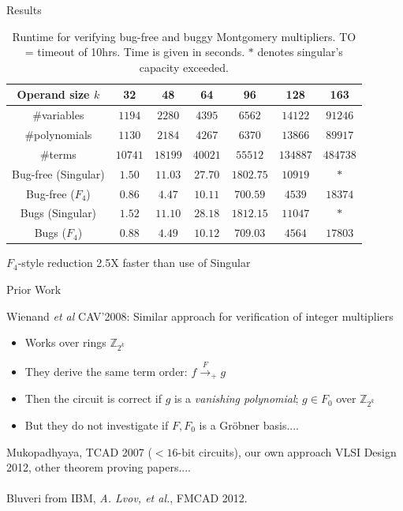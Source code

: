 \documentclass[xcolor=dvipsnames]{beamer}
\begin{document}

\begin{frame}{Results}

\begin{table}[htb!]
\begin{center}
{\small
\caption{ Runtime for verifying bug-free and buggy Montgomery
  multipliers. TO = timeout of 10hrs. Time is given
  in seconds. $\ast$ denotes {\sc singular}'s capacity exceeded.} 
\label{tab:mmexp}
\begin{tabular}{|c||c|c|c|c|c|c|} \hline 
Operand size $k$ &  32 & 48 & 64 & 96 & 128 &163\\
\hline
\#variables     &$1194$     &$2280$     &$4395$     &$6562$     &$14122$  &$91246$\\
\hline
\#polynomials    &$1130$     &$2184$     &$4267$     &$6370$     &$13866$  &$89917$\\
\hline
\#terms          &$10741$    &$18199$    &$40021$    &$55512$    &$134887$ &$484738$\\
\hline \hline
Bug-free (Singular) &$1.50$  &$11.03$    &$27.70$    &$1802.75$  &$10919$   &$\ast$\\
\hline
Bug-free ($F_4$)   &$0.86$     &$4.47$     &$10.11$    &$700.59$   &$4539$    &$18374$\\
\hline \hline
Bugs (Singular)  &$1.52$     &$11.10$    &$28.18$    &$1812.15$  &$11047$   &$\ast$\\
\hline
Bugs ($F_4$)       &$0.88$     &$4.49$     &$10.12$    &$709.03$   &$4564$    &$17803$\\
\hline
\end{tabular}
}
\end{center}
\end{table}

$F_4$-style reduction 2.5X faster than use of Singular

\end{frame}

\begin{frame}{Prior Work}

Wienand {\it et al} CAV'2008: Similar approach for verification
  of integer multipliers
\begin{itemize}
\item Works over rings $\mathbb{Z}_{2^k}$
\item They derive the same term order: $f\stackrel{F}
  {\textstyle\longrightarrow}_+ g$
\item Then the circuit is correct if $g$ is a {\it vanishing
    polynomial}; $g \in F_0$ over $\mathbb{Z}_{2^k}$
\item But they do not investigate if $F, F_0$ is a Gr\"obner basis....
\end{itemize}
Mukopadhyaya, TCAD 2007 ($<16$-bit circuits), our own approach VLSI
Design 2012, other theorem proving papers....\\

\ \\
{\sc Bluveri} from IBM,  {\it A. Lvov, et al.}, FMCAD 2012.
\end{frame}
\end{document}
